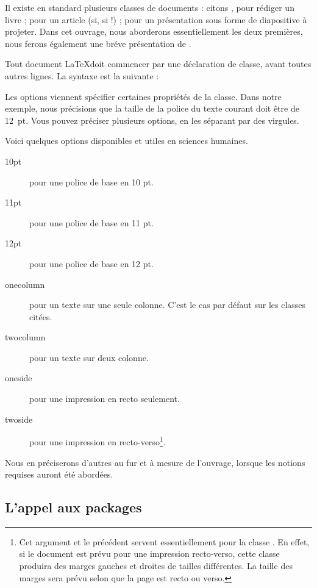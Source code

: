 Il existe en standard plusieurs classes de documents : citons , pour rédiger un livre ;  pour un article (si, si !) ;  pour un présentation sous forme de diapositive à projeter. Dans cet ouvrage, nous aborderons essentiellement les deux premières, nous ferons également une bréve présentation de .



Tout document \LaTeX doit commencer par une déclaration de classe, avant toutes autres lignes. La syntaxe est la suivante :


Les options viennent spécifier certaines propriétés de la classe. Dans notre exemple, nous précisions que la taille de la police du texte courant doit être de 12~pt. Vous pouvez préciser plusieurs options, en les séparant par des virgules. \label{optionsclasse}
 
 Voici quelques options disponibles et utiles en sciences humaines. 

\begin{description}
\item[10pt] pour une police de base en 10 pt.
\item[11pt] pour une police de base en 11 pt.
\item[12pt] pour une police de base en 12 pt.
\item[onecolumn] pour un texte sur une seule colonne. C'est le cas par défaut sur les classes citées.
\item[twocolumn] pour un texte sur deux colonne.
\item[oneside] pour une impression en recto seulement.
\item[twoside] pour une impression en recto-verso\footnote{Cet argument et le précédent servent essentiellement pour la classe . En effet, si le document est prévu pour une impression recto-verso, cette classe produira des marges gauches et droites de tailles différentes. La taille des marges sera prévu selon que la page est recto ou verso.}.\label{rectoverso}
\end{description}

Nous en préciserons d'autres au fur et à mesure de l'ouvrage, lorsque les notions requises auront été abordées.

\subsection{L'appel aux packages}

